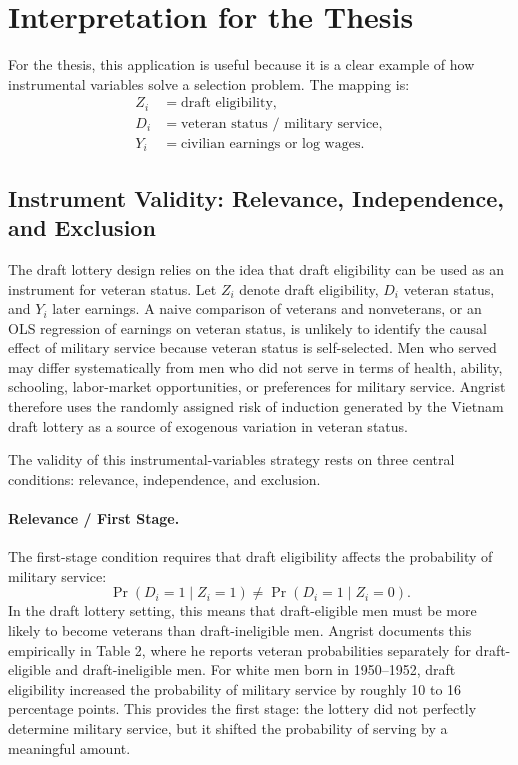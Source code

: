 \documentclass[11pt,a4paper]{article}
\begin{document}
\section{Interpretation for the Thesis}

For the thesis, this application is useful because it is a clear example of how instrumental variables solve a selection problem. The mapping is:
\begin{align*}
    Z_i &= \text{draft eligibility}, \\
    D_i &= \text{veteran status / military service}, \\
    Y_i &= \text{civilian earnings or log wages}.
\end{align*}



\subsection{Instrument Validity: Relevance, Independence, and Exclusion}

The draft lottery design relies on the idea that draft eligibility can be used as an
instrument for veteran status. Let \(Z_i\) denote draft eligibility, \(D_i\) veteran
status, and \(Y_i\) later earnings. A naive comparison of veterans and nonveterans,
or an OLS regression of earnings on veteran status, is unlikely to identify the causal
effect of military service because veteran status is self-selected. Men who served may
differ systematically from men who did not serve in terms of health, ability, schooling,
labor-market opportunities, or preferences for military service. Angrist therefore uses
the randomly assigned risk of induction generated by the Vietnam draft lottery as a
source of exogenous variation in veteran status.

The validity of this instrumental-variables strategy rests on three central conditions:
relevance, independence, and exclusion.

\paragraph{Relevance / First Stage.}
The first-stage condition requires that draft eligibility affects the probability of
military service:
\[
    \Pr(D_i = 1 \mid Z_i = 1) \neq \Pr(D_i = 1 \mid Z_i = 0).
\]
In the draft lottery setting, this means that draft-eligible men must be more likely to
become veterans than draft-ineligible men. Angrist documents this empirically in Table 2,
where he reports veteran probabilities separately for draft-eligible and draft-ineligible
men. For white men born in 1950--1952, draft eligibility increased the probability of
military service by roughly 10 to 16 percentage points. This provides the first stage:
the lottery did not perfectly determine military service, but it shifted the probability
of serving by a meaningful amount.
\end{document}
